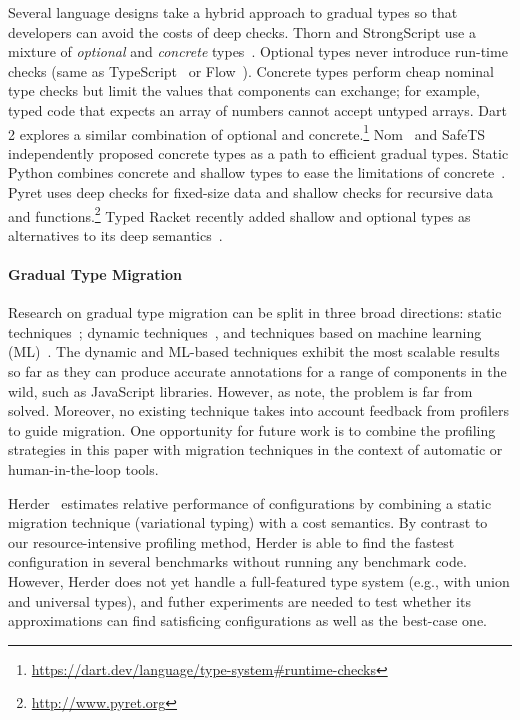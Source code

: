 Several language designs take a hybrid approach to gradual types
so that developers can avoid the costs of deep checks.
Thorn and StrongScript use a mixture of
\emph{optional} and \emph{concrete} types~\citep{wzlov-popl-2010,rzv-ecoop-2015}.
Optional types never introduce run-time checks (same as TypeScript~\cite{bat-ecoop-2014} or Flow~\cite{cvgrl-oopsla-2017}).
Concrete types perform cheap nominal type checks but limit the values that components
can exchange; for example, typed code that expects an array of numbers cannot accept
untyped arrays.
Dart 2 explores a similar combination of optional and
concrete.\footnote{\url{https://dart.dev/language/type-system\#runtime-checks}}
Nom~\cite{mt-oopsla-2017,mt-oopsla-2021} and SafeTS~\cite{rsfbv-popl-2015} independently
proposed concrete types as a path to efficient gradual types.
Static Python combines concrete and shallow types to ease the limitations
of concrete~\citep{lgmvpk-pj-2023}.
Pyret uses deep checks for fixed-size data and shallow checks for recursive
data and functions.\footnote{\url{http://www.pyret.org}}
Typed Racket recently added shallow and optional types as alternatives to its deep
semantics~\cite{g-deep-shallow}.

\paragraph{Gradual Type Migration}
Research on gradual type migration can be split in three broad directions:
static techniques~\cite{rch:in-out-infer-gt, km:ts-type-evo,
mp:gt-decidable, ccew:gt-migrate, gc:gt-infer,
cagg-solver-based-migration,clps-popl-2020,js-infer,ruby-static-infer,unif-infer};
dynamic
techniques~\cite{msi:gt-infer-hm, dyn-infer-ruby, profile-guided-typing, gen-ts-decl, jstrace},
and techniques based on machine learning
(ML)~\cite{lambdanet,nl2ptype,learn-types-big-data,ml-ts}. The dynamic
and ML-based techniques exhibit the most scalable results so far as they
can produce accurate annotations for a range of components in the wild,
such as JavaScript libraries.
However, as \citet{ml-ts} note, the problem is far from solved.
Moreover, no existing technique takes into account feedback from profilers to
guide migration.
One opportunity for future work is to combine the profiling strategies in this
paper with migration techniques in the context of automatic or
human-in-the-loop tools.

Herder~\cite{ccw-icfp-2018} estimates relative performance of configurations
by combining a static migration
technique (variational typing) with a cost semantics.
By contrast to our resource-intensive profiling method, Herder is able to find
the fastest configuration in several benchmarks without running any benchmark
code.
However, Herder does not yet handle a full-featured type system (e.g., with union
and universal types), and futher experiments are needed to test whether its
approximations can find satisficing configurations as well as the best-case one.


